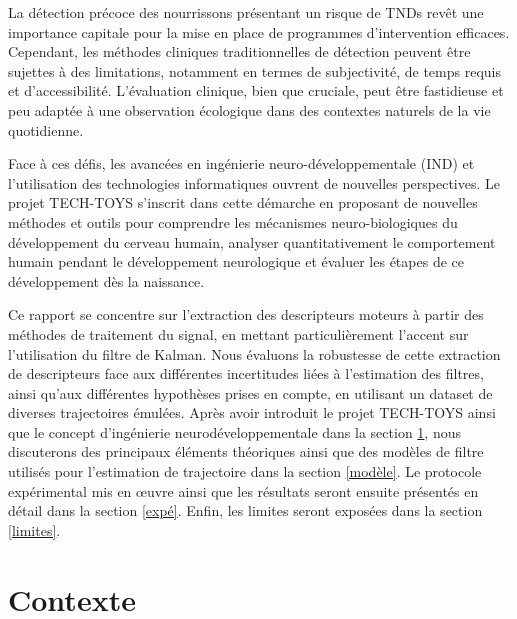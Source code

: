 \documentclass[8pt]{article}
\begin{document}
La détection précoce des nourrissons présentant un risque de TNDs revêt une importance capitale pour la mise en place de programmes d'intervention efficaces. Cependant, les méthodes cliniques traditionnelles de détection peuvent être sujettes à des limitations, notamment en termes de subjectivité, de temps requis et d'accessibilité. L'évaluation clinique, bien que cruciale, peut être fastidieuse et peu adaptée à une observation écologique dans des contextes naturels de la vie quotidienne.

Face à ces défis, les avancées en ingénierie neuro-développementale (IND) et l'utilisation des technologies informatiques ouvrent de nouvelles perspectives. Le projet TECH-TOYS s'inscrit dans cette démarche en proposant de nouvelles méthodes et outils pour comprendre les mécanismes neuro-biologiques du développement du cerveau humain, analyser quantitativement le comportement humain pendant le développement neurologique et évaluer les étapes de ce développement dès la naissance.

Ce rapport se concentre sur l'extraction des descripteurs moteurs à partir des méthodes de traitement du signal, en mettant particulièrement l'accent sur l'utilisation du filtre de Kalman. Nous évaluons la robustesse de cette extraction de descripteurs face aux différentes incertitudes liées à l'estimation des filtres, ainsi qu'aux différentes hypothèses prises en compte, en utilisant un dataset de diverses trajectoires émulées. Après avoir introduit le projet TECH-TOYS ainsi que le concept d'ingénierie neurodéveloppementale dans la section \ref{contexte}, nous discuterons des principaux éléments théoriques ainsi que des modèles de filtre utilisés pour l'estimation de trajectoire dans la section \ref{modèle}. Le protocole expérimental mis en œuvre ainsi que les résultats seront ensuite présentés en détail dans la section \ref{expé}. Enfin, les limites seront exposées dans la section \ref{limites}.
\newpage
\section{Contexte}
\label{contexte}
\end{document}
